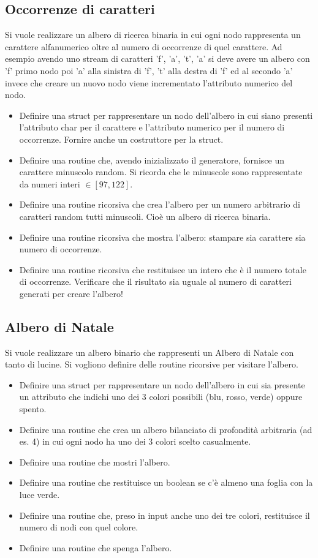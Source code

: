 \documentclass{article}
\begin{document}
\subsection{Occorrenze di caratteri}
Si vuole realizzare un albero di ricerca binaria in cui ogni nodo rappresenta un carattere alfanumerico oltre al numero di occorrenze di quel carattere. Ad esempio avendo uno stream di caratteri 'f', 'a', 't', 'a' si deve avere un albero con 'f' primo nodo poi 'a' alla sinistra di 'f', 't' alla destra di 'f' ed al secondo 'a' invece che creare un nuovo nodo viene incrementato l'attributo numerico del nodo.
	\begin{itemize}
	\item Definire una struct per rappresentare un nodo dell'albero in cui siano presenti l'attributo char per il carattere e l'attributo numerico per il numero di occorrenze. Fornire anche un costruttore per la struct.
	\item Definire una routine che, avendo inizializzato il generatore, fornisce un carattere minuscolo random. Si ricorda che le minuscole sono rappresentate da numeri interi $\in [97,122]$.
	\item Definire una routine ricorsiva che crea l'albero per un numero arbitrario di caratteri random tutti minuscoli. Cioè un albero di ricerca binaria.
	\item Definire una routine ricorsiva che mostra l'albero: stampare sia carattere sia numero di occorrenze.
	\item Definire una routine ricorsiva che restituisce un intero che è il numero totale di occorrenze. Verificare che il risultato sia uguale al numero di caratteri generati per creare l'albero!
	\end{itemize}
	
\subsection{Albero di Natale}
Si vuole realizzare un albero binario che rappresenti un Albero di Natale con tanto di lucine. Si vogliono definire delle routine ricorsive per visitare l'albero. 
	\begin{itemize}
	\item Definire una struct per rappresentare un nodo dell'albero in cui sia presente un attributo che indichi uno dei 3 colori possibili (blu, rosso, verde) oppure spento.
	\item Definire una routine che crea un albero bilanciato di profondità arbitraria (ad es. 4) in cui ogni nodo ha uno dei 3 colori scelto casualmente.
	\item Definire una routine che mostri l'albero.
	\item Definire una routine che restituisce un boolean se c'è almeno una foglia con la luce verde.
	\item Definire una routine che, preso in input anche uno dei tre colori, restituisce il numero di nodi con quel colore.
	\item Definire una routine che spenga l'albero.
	\end{itemize}
\end{document}
